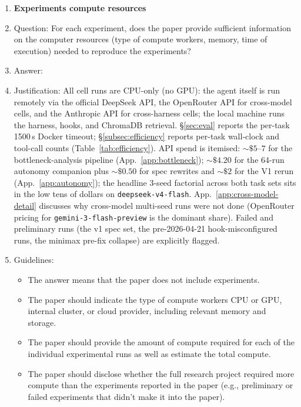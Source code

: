 \begin{enumerate}
\item {\bf Experiments compute resources}
    \item[] Question: For each experiment, does the paper provide sufficient information on the computer resources (type of compute workers, memory, time of execution) needed to reproduce the experiments?
    \item[] Answer: \answerYes{}
    \item[] Justification: All cell runs are CPU-only (no GPU): the agent itself is run remotely via the official DeepSeek API, the OpenRouter API for cross-model cells, and the Anthropic API for cross-harness cells; the local machine runs the harness, hooks, and ChromaDB retrieval. \S\ref{sec:eval} reports the per-task 1500\,s Docker timeout; \S\ref{subsec:efficiency} reports per-task wall-clock and tool-call counts (Table~\ref{tab:efficiency}). API spend is itemised: ${\sim}\$5$--$7$ for the bottleneck-analysis pipeline (App.~\ref{app:bottleneck}); ${\sim}\$4.20$ for the 64-run autonomy companion plus ${\sim}\$0.50$ for spec rewrites and ${\sim}\$2$ for the V1 rerun (App.~\ref{app:autonomy}); the headline 3-seed factorial across both task sets sits in the low tens of dollars on \texttt{deepseek-v4-flash}. App.~\ref{app:cross-model-detail} discusses why cross-model multi-seed runs were not done (OpenRouter pricing for \texttt{gemini-3-flash-preview} is the dominant share). Failed and preliminary runs (the v1 spec set, the pre-2026-04-21 hook-misconfigured runs, the minimax pre-fix collapse) are explicitly flagged.
    \item[] Guidelines:
    \begin{itemize}
        \item The answer \answerNA{} means that the paper does not include experiments.
        \item The paper should indicate the type of compute workers CPU or GPU, internal cluster, or cloud provider, including relevant memory and storage.
        \item The paper should provide the amount of compute required for each of the individual experimental runs as well as estimate the total compute.
        \item The paper should disclose whether the full research project required more compute than the experiments reported in the paper (e.g., preliminary or failed experiments that didn't make it into the paper).
    \end{itemize}


\end{enumerate}
